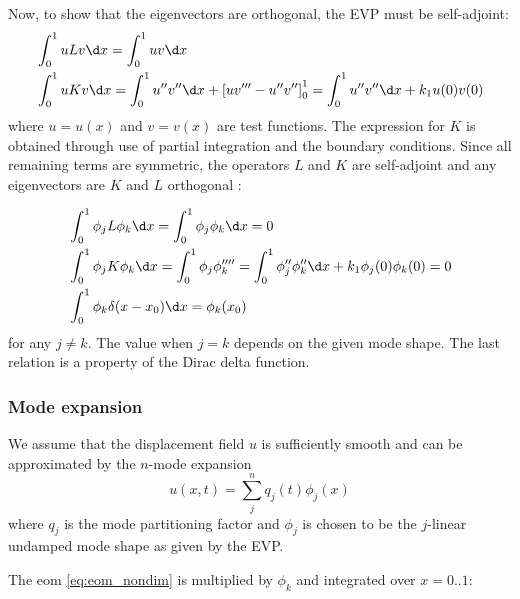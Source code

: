 Now, to show that the eigenvectors are orthogonal, the EVP must be self-adjoint:
\begin{subequations}
  \label{eq:self_adjont1}
\begin{align}
  &\int_0^1 uLv \d x = \int_0^1 uv \d x \\
  &\int_0^1 uKv \d x = \int_0^1 u''v'' \d x +
    \left[
    uv''' - u''v''
    \right]_0^1
    =
   \int_0^1 u''v'' \d x + k_1u(0)v(0)
\end{align}
\end{subequations}
where $u=u(x)$ and $v=v(x)$ are test functions. The expression for $K$ is
obtained through use of partial integration and the boundary conditions. Since
all remaining terms are symmetric, the operators $L$ and $K$ are self-adjoint
and any eigenvectors are $K$ and $L$ orthogonal \cite{juel2003a}:

\begin{subequations}
\label{eq:orth_relation}
\begin{align}
  &\int_{0}^{1} \phi_{j} L \phi_{k} \d x = \int_{0}^{1} \phi_{j} \phi_{k} \d x = 0  \label{eq:orth_relL} \\
  &\int_{0}^{1} \phi_{j} K \phi_{k} \d x = \int_{0}^{1} \phi_{j} \phi_k'''' =
  \int_{0}^{1} \phi''_{j} \phi''_{k} \d x + k_1\phi_j(0) \phi_k(0) = 0 \label{eq:orth_relK} \\
  &\int_{0}^{1} \phi_{k} \delta(x-x_0) \d x = \phi_k(x_0)  \label{eq:orth_reldelta}
\end{align}
\end{subequations}
for any $j \neq k$. The value when $j=k$ depends on the given mode shape. The
last relation is a property of the Dirac delta function.


\subsubsection{Mode expansion}
\label{sec:mode_expansion}


We assume that the displacement field $u$ is sufficiently smooth and can be
approximated by the $n$-mode expansion
\begin{equation}
  \label{eq:n-mode-expansion}
  u(x,t) = \sum_{j}^n q_j(t) \phi_j(x)
\end{equation}
where $q_j$ is the mode partitioning factor and $\phi_j$ is chosen to be the
$j$-linear undamped mode shape as given by the EVP.


The eom \eqref{eq:eom_nondim} is multiplied by $\phi_k$ and integrated over
$x=0..1$:

